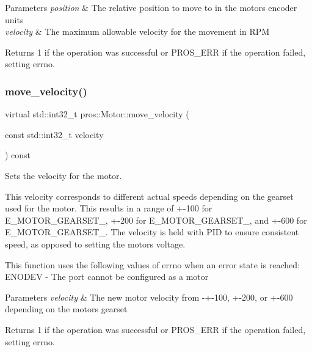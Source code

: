 \begin{DoxyParams}{Parameters}
{\em position} & The relative position to move to in the motor\textquotesingle{}s encoder units \\
\hline
{\em velocity} & The maximum allowable velocity for the movement in R\+PM\\
\hline
\end{DoxyParams}
\begin{DoxyReturn}{Returns}
1 if the operation was successful or P\+R\+O\+S\+\_\+\+E\+RR if the operation failed, setting errno. 
\end{DoxyReturn}
\mbox{\label{classpros_1_1Motor_a797de937c2d550c3fa199806db07dbcc}} 
\subsubsection{\texorpdfstring{move\+\_\+velocity()}{move\_velocity()}}
{\footnotesize\ttfamily virtual std\+::int32\+\_\+t pros\+::\+Motor\+::move\+\_\+velocity (\begin{DoxyParamCaption}\item[{const std\+::int32\+\_\+t}]{velocity }\end{DoxyParamCaption}) const\hspace{0.3cm}{\ttfamily [virtual]}}



Sets the velocity for the motor. 

This velocity corresponds to different actual speeds depending on the gearset used for the motor. This results in a range of +-\/100 for E\+\_\+\+M\+O\+T\+O\+R\+\_\+\+G\+E\+A\+R\+S\+E\+T\+\_, +-\/200 for E\+\_\+\+M\+O\+T\+O\+R\+\_\+\+G\+E\+A\+R\+S\+E\+T\+\_, and +-\/600 for E\+\_\+\+M\+O\+T\+O\+R\+\_\+\+G\+E\+A\+R\+S\+E\+T\+\_. The velocity is held with P\+ID to ensure consistent speed, as opposed to setting the motor\textquotesingle{}s voltage.

This function uses the following values of errno when an error state is reached\+: E\+N\+O\+D\+EV -\/ The port cannot be configured as a motor


\begin{DoxyParams}{Parameters}
{\em velocity} & The new motor velocity from -\/+-\/100, +-\/200, or +-\/600 depending on the motor\textquotesingle{}s gearset\\
\hline
\end{DoxyParams}
\begin{DoxyReturn}{Returns}
1 if the operation was successful or P\+R\+O\+S\+\_\+\+E\+RR if the operation failed, setting errno. 
\end{DoxyReturn}
\mbox{\label{classpros_1_1Motor_a3c79db57c20617fbbc49461c58612cfb}} 
